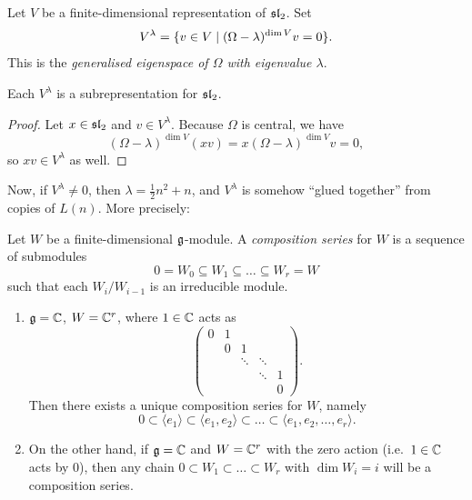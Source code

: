 \begin{definition}
Let $V$ be a finite-dimensional representation of $\sl_2$. Set
\[
  V^\lambda = \setc{v \in V}{(\Omega - \lambda)^{\dim V}v = 0}.
\]
This is the \emph{generalised eigenspace of $\Omega$ with eigenvalue
$\lambda$}.
\end{definition}

\begin{claim}
Each $V^\lambda$ is a subrepresentation for $\sl_2$.
\end{claim}

\begin{proof}
Let $x \in \sl_2$ and $v \in V^\lambda$. Because $\Omega$ is central, we have
\[
  (\Omega - \lambda)^{\dim V}(xv) = x(\Omega - \lambda)^{\dim V}v = 0,
\]
so $xv \in V^\lambda$ as well.
\end{proof}

Now, if $V^\lambda \neq 0$, then $\lambda = \frac12 n^2 + n$, and $V^\lambda$
is somehow ``glued together'' from copies of $L(n)$. More precisely:

\begin{definition}
Let $W$ be a finite-dimensional $\g$-module. A \emph{composition series} for
$W$ is a sequence of submodules
\[
  0 = W_0 \subseteq W_1 \subseteq \dots \subseteq W_r = W
\]
such that each $W_i/W_{i-1}$ is an irreducible module.
\end{definition}

\begin{example}\leavevmode
\begin{enumerate}
  \item $\g = \C$, $W = \C^r$, where $1 \in \C$ acts as
    \[
      \begin{pmatrix}
        0 & 1 &        &        &   \\
          & 0 & 1      &        &   \\
          &   & \ddots & \ddots &   \\
          &   &        & \ddots & 1 \\
          &   &        &        & 0
      \end{pmatrix}.
    \]
    Then there exists a unique composition series for $W$, namely
    \[
      0 \subset \langle e_1\rangle \subset \langle e_1, e_2\rangle \subset \dots
        \subset \langle e_1, e_2, \dots, e_r\rangle.
    \]
  \item On the other hand, if $\g = \C$ and $W = \C^r$ with the zero action
    (i.e.\ $1 \in \C$ acts by $0$), then any chain
    $0 \subset W_1 \subset \dots \subset W_r$ with $\dim W_i = i$ will be a
    composition series.
\end{enumerate}
\end{example}

